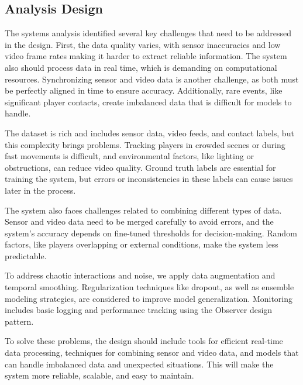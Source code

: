 \documentclass[conference]{IEEEtran}
\begin{document}
	\subsection{Analysis Design}
	
	
	The systems analysis identified several key challenges that need to be addressed in the design. First, the data quality varies, with sensor inaccuracies and low video frame rates making it harder to extract reliable information. The system also should process data in real time, which is demanding on computational resources. Synchronizing sensor and video data is another challenge, as both must be perfectly aligned in time to ensure accuracy. Additionally, rare events, like significant player contacts, create imbalanced data that is difficult for models to handle. 
	
	The dataset is rich and includes sensor data, video feeds, and contact labels, but this complexity brings problems. Tracking players in crowded scenes or during fast movements is difficult, and environmental factors, like lighting or obstructions, can reduce video quality. Ground truth labels are essential for training the system, but errors or inconsistencies in these labels can cause issues later in the process. 
	
	The system also faces challenges related to combining different types of data. Sensor and video data need to be merged carefully to avoid errors, and the system’s accuracy depends on fine-tuned thresholds for decision-making. Random factors, like players overlapping or external conditions, make the system less predictable. 
	
	To address chaotic interactions and noise, we apply data augmentation and temporal smoothing. Regularization techniques like dropout, as well as ensemble modeling strategies, are considered to improve model generalization. Monitoring includes basic logging and performance tracking using the Observer design pattern.
	
	To solve these problems, the design should include tools for efficient real-time data processing, techniques for combining sensor and video data, and models that can handle imbalanced data and unexpected situations. This will make the system more reliable, scalable, and easy to maintain. 
	
\end{document}
